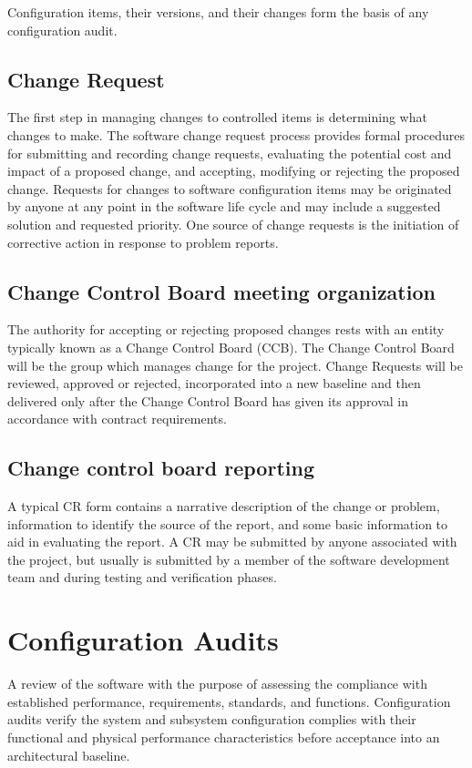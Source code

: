 \documentclass{template/openetcs_article}
\begin{document}
Configuration items, their versions, and their changes form the basis of any configuration audit.

\subsection{Change Request} %
The first step in managing changes to controlled items is determining what changes to make. The software change request  process provides formal procedures for submitting and recording change requests, evaluating the potential cost and impact of  a proposed change, and accepting, modifying or rejecting the proposed change. Requests for changes to software  configuration items may be originated by anyone at any point in the software life cycle and may include a suggested solution  and requested priority. One source of change requests is the initiation of corrective action in response to problem reports.

\subsection{Change Control Board meeting organization} %
The authority for accepting or rejecting proposed changes rests with an entity typically known as a Change Control Board  (CCB). The Change Control Board will be the group which manages change for the project. Change Requests will be reviewed,  approved or rejected, incorporated into a new baseline and then delivered only after the Change Control Board has given its  approval in accordance with contract requirements.

\subsection{Change control board reporting} %
A typical CR form contains a narrative description of the change or problem, information to identify the source of the report,  and some basic information to aid in evaluating the report. A CR may be submitted by anyone associated with the project, but  usually is submitted by a member of the software development team and during testing and verification phases.


\section{Configuration Audits} %
A review of the software with the purpose of assessing the compliance with established performance, requirements,  standards, and functions. Configuration audits verify the system and subsystem configuration complies with their functional  and physical performance characteristics before acceptance into an architectural baseline.
\end{document}
